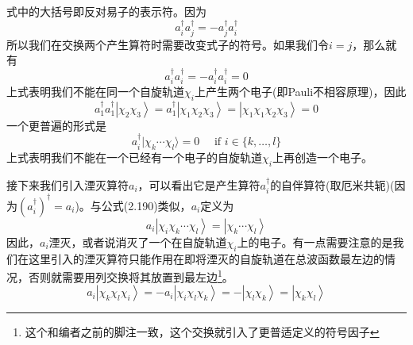 \documentclass[12pt,a4paper,openany,twoside]{book}
\numberwithin{equation}{section}
\begin{document}
      式中的大括号即反对易子的表示符。因为
      \begin{equation}
        a_{i}^{\dagger} a_{j}^{\dagger}=-a_{j}^{\dagger} a_{i}^{\dagger}
      \end{equation}
      所以我们在交换两个产生算符时需要改变式子的符号。如果我们令$i=j$，那么就有
      \begin{equation}
        a_{i}^{\dagger} a_{i}^{\dagger}=-a_{i}^{\dagger} a_{i}^{\dagger}=0
      \end{equation}
      上式表明我们不能在同一个自旋轨道$\chi_i$上产生两个电子(即Pauli不相容原理)，因此
      \begin{equation}
          a_1^{\dagger}a_1^{\dagger}\left|\chi_2\chi_3\right\rangle=a_1^{\dagger}\left|\chi_1\chi_2\chi_3\right\rangle=\left|\chi_1\chi_1\chi_2\chi_3\right\rangle=0
      \end{equation}
      一个更普遍的形式是
      \begin{equation}
        a_{i}^{\dagger} | \chi_{k} \cdots \chi_{l} \rangle=0 \quad \text { if } i \in\{k, \ldots, l\}
      \end{equation}
      上式表明我们不能在一个已经有一个电子的自旋轨道$\chi_i$上再创造一个电子。
      
      接下来我们引入湮灭算符$a_i$，可以看出它是产生算符$a_i^{\dagger}$的自伴算符(取厄米共轭)(因为$(a_i^{\dagger})^\dagger=a_i$)。与公式(2.190)类似，$a_i$定义为
      \begin{equation}
          a_i\left|\chi_i\chi_k\cdots\chi_l\right\rangle=\left|\chi_k\cdots\chi_l\right\rangle
          \label{annihilation operator}
      \end{equation}
      因此，$a_i$湮灭，或者说消灭了一个在自旋轨道$\chi_i$上的电子。有一点需要注意的是我们在这里引入的湮灭算符只能作用在即将湮灭的自旋轨道在总波函数最左边的情况，否则就需要用列交换将其放置到最左边\footnote{这个和编者之前的脚注一致，这个交换就引入了更普适定义的符号因子}。
      \begin{equation}
          a_i\left|\chi_k\chi_l\chi_i\right\rangle=-a_i\left|\chi_i\chi_l\chi_k\right\rangle
          =-\left|\chi_l\chi_k\right\rangle=\left|\chi_k\chi_l\right\rangle
      \end{equation}
      
\end{document}
